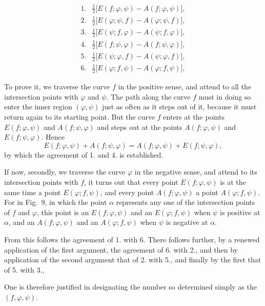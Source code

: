 \[
\begin{array}{ll}
1. & \tfrac{1}{2}\big[E(f; \varphi, \psi) - A(f; \varphi, \psi)\big], \\
2. & \tfrac{1}{2}\big[E(\varphi; \psi, f) - A(\varphi; \psi, f)\big], \\
3. & \tfrac{1}{2}\big[E(\psi; f, \varphi) - A(\psi; f, \varphi)\big], \\
4. & \tfrac{1}{2}\big[E(f; \psi, \varphi) - A(f; \psi, \varphi)\big], \\
5. & \tfrac{1}{2}\big[E(\psi; \varphi, f) - A(\psi; \varphi, f)\big], \\
6. & \tfrac{1}{2}\big[E(\varphi; f, \psi) - A(\varphi; f, \psi)\big],
\end{array}
\]

To prove it, we traverse the curve $f$ in the positive
sense, and attend to all the intersection points with $\varphi$
and $\psi$. The path along the curve $f$ must in doing so enter
the inner region $(\varphi, \psi)$ just as often as it steps out of it,
because it must return again to its starting point.
But the curve $f$ enters at the points $E(f; \varphi, \psi)$
and $A(f; \psi, \varphi)$ and steps out at the points $A(f; \varphi, \psi)$ and
$E(f; \psi, \varphi)$. Hence
\[
E(f; \varphi, \psi) + A(f; \psi, \varphi) = A(f; \varphi, \psi) + E(f; \psi, \varphi),
\]
by which the agreement of 1. and 4. is established.


If now, secondly, we traverse the curve $\varphi$ in the negative sense,
and attend to its intersection points with $f$, it turns out
that every point $E(f; \varphi, \psi)$ is at the same time a point $E(\varphi; f, \psi)$,
and every point $A(f; \varphi, \psi)$ a point $A(\varphi; f, \psi)$. For in
Fig.~9, in which the point $\alpha$ represents any one of the intersection points
of $f$ and $\varphi$, this point is an $E(f; \varphi, \psi)$ and
an $E(\varphi; f, \psi)$ when $\psi$ is positive at $\alpha$, and an $A(f; \varphi, \psi)$ and
an $A(\varphi; f, \psi)$ when $\psi$ is negative at $\alpha$.

From this follows the agreement of 1. with 6. There follows
further, by a renewed application of the first argument, the
agreement of 6. with 2., and then by application of the
second argument that of 2. with 5., and finally by the first that
of 5. with 3., 

One is therefore justified in designating the number so determined
simply as the  $(f, \varphi, \psi)$.
